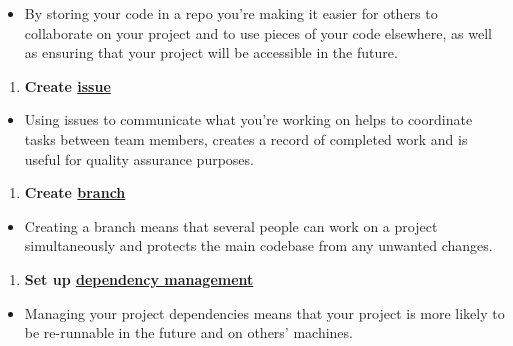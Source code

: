 \documentclass[]{book}
\providecommand{\tightlist}{%
  \setlength{\itemsep}{0pt}\setlength{\parskip}{0pt}}
\begin{document}
\begin{itemize}
\tightlist
\item
  By storing your code in a repo you're making it easier for others to collaborate on your project and to use pieces of your code elsewhere, as well as ensuring that your project will be accessible in the future.
\end{itemize}

\begin{enumerate}
\def\labelenumi{\arabic{enumi}.}
\setcounter{enumi}{1}
\tightlist
\item
  \textbf{Create \protect\hyperlink{versioncontrol}{issue}}\\
\end{enumerate}

\begin{itemize}
\tightlist
\item
  Using issues to communicate what you're working on helps to coordinate tasks between team members, creates a record of completed work and is useful for quality assurance purposes.
\end{itemize}

\begin{enumerate}
\def\labelenumi{\arabic{enumi}.}
\setcounter{enumi}{2}
\tightlist
\item
  \textbf{Create \protect\hyperlink{versioncontrol}{branch}}\\
\end{enumerate}

\begin{itemize}
\tightlist
\item
  Creating a branch means that several people can work on a project simultaneously and protects the main codebase from any unwanted changes.\\
\end{itemize}

\begin{enumerate}
\def\labelenumi{\arabic{enumi}.}
\setcounter{enumi}{3}
\tightlist
\item
  \textbf{Set up \protect\hyperlink{projdep}{dependency management}}\\
\end{enumerate}

\begin{itemize}
\tightlist
\item
  Managing your project dependencies means that your project is more likely to be re-runnable in the future and on others' machines.\\
\end{itemize}
\end{document}
